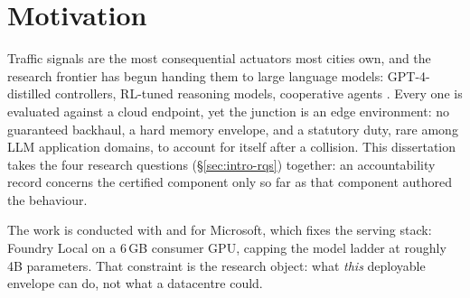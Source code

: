 \section{Motivation}\label{sec:intro-motivation}
Traffic signals are the most consequential actuators most cities own, and
the research frontier has begun handing them to large language models:
GPT-4-distilled controllers, RL-tuned reasoning models, cooperative
agents \cite{lai2023llmlight,wang2025trafficr1,collmlight2025}. Every one
is evaluated against a cloud
endpoint, yet the junction is an edge environment: no guaranteed
backhaul, a hard memory envelope, and a statutory duty,
rare among LLM application domains, to account for itself after a
collision. This dissertation takes the four research questions
(\S\ref{sec:intro-rqs}) together: an accountability record concerns the
certified component only so far as that component authored the behaviour.

The work is conducted with and for Microsoft, which fixes the serving
stack: Foundry Local on a 6\,GB consumer GPU, capping the model ladder at
roughly 4B parameters. That constraint is the research object: what
\emph{this} deployable envelope can do, not what a datacentre could.

